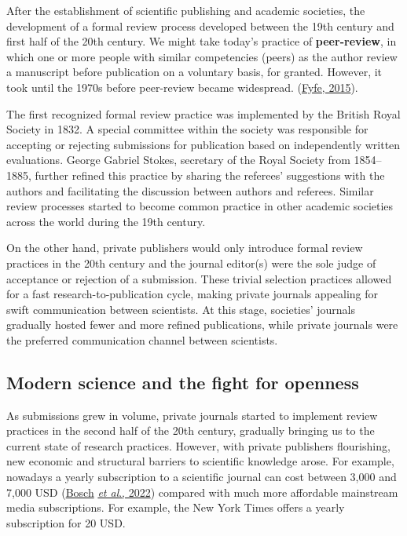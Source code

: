 \documentclass[
]{book}
\begin{document}
After the establishment of scientific publishing and academic societies, the development of a formal review process developed between the 19th century and first half of the 20th century. We might take today's practice of \textbf{peer-review}, in which one or more people with similar competencies (peers) as the author review a manuscript before publication on a voluntary basis, for granted. However, it took until the 1970s before peer-review became widespread. (\href{https://web.archive.org/web/20220316123936/https:/www.timeshighereducation.com/features/peer-review-not-old-you-might-think}{Fyfe, 2015}).

The first recognized formal review practice was implemented by the British Royal Society in 1832. A special committee within the society was responsible for accepting or rejecting submissions for publication based on independently written evaluations. George Gabriel Stokes, secretary of the Royal Society from 1854--1885, further refined this practice by sharing the referees' suggestions with the authors and facilitating the discussion between authors and referees. Similar review processes started to become common practice in other academic societies across the world during the 19th century.

On the other hand, private publishers would only introduce formal review practices in the 20th century and the journal editor(s) were the sole judge of acceptance or rejection of a submission. These trivial selection practices allowed for a fast research-to-publication cycle, making private journals appealing for swift communication between scientists. At this stage, societies' journals gradually hosted fewer and more refined publications, while private journals were the preferred communication channel between scientists.

\hypertarget{modern-science-and-the-fight-for-openness}{%
\subsection{Modern science and the fight for openness}\label{modern-science-and-the-fight-for-openness}}

As submissions grew in volume, private journals started to implement review practices in the second half of the 20th century, gradually bringing us to the current state of research practices. However, with private publishers flourishing, new economic and structural barriers to scientific knowledge arose. For example, nowadays a yearly subscription to a scientific journal can cost between 3,000 and 7,000 USD (\href{https://www.libraryjournal.com/story/Are-We-There-Yet-Periodicals-Price-Survey-2022}{Bosch} \href{https://www.libraryjournal.com/story/Are-We-There-Yet-Periodicals-Price-Survey-2022}{\emph{et al}., 2022}) compared with much more affordable mainstream media subscriptions. For example, the New York Times offers a yearly subscription for 20 USD.
\end{document}

